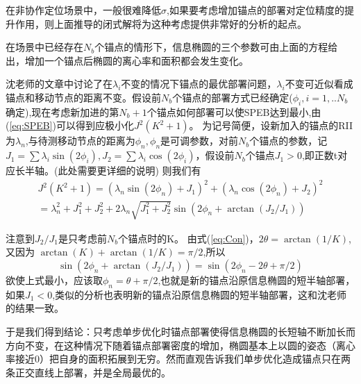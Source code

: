 \documentclass[12pt]{article}
\theoremstyle{remark}
\begin{document}
在非协作定位场景中，一般很难降低$\sigma$,如果要考虑增加锚点的部署对定位精度的提升作用，则上面推导的闭式解将为这种考虑提供非常好的分析的起点。

在场景中已经存在$N_b$个锚点的情形下，信息椭圆的三个参数可由上面的方程给出，增加一个锚点后椭圆的离心率和面积都会发生变化。

沈老师的文章中讨论了在$\lambda_i$不变的情况下锚点的最优部署问题，$\lambda_i$不变可近似看成锚点和移动节点的距离不变。假设前$N_b$个锚点的部署方式已经确定($\phi_i,i=1,..N_b$确定),现在考虑新加进的第$N_b+1$个锚点如何部署可以使SPEB达到最小,由(\ref{eq:SPEB})可以得到应极小化$J^2(K^2+1)$。
为记号简便，设新加入的锚点的RII为$\lambda_n$,与待测移动节点的距离为$\phi_n,\phi_n$是可调参数，对前$N_b$个锚点的参数，记$J_1=\sum \lambda_i \sin(2\phi_i),
J_2=\sum \lambda_i \cos(2\phi_i)$，假设前$N_b$个锚点$J_1>0$,即正数t对应长半轴。(此处需要更详细的说明)
则我们有
\begin{equation}
\begin{split}
J^2(K^2+1)=(\lambda_n\sin(2\phi_n)+J_1)^2+(\lambda_n\cos(2\phi_n)+J_2)^2\\
=\lambda_n^2+J_1^2+J_2^2 + 2\lambda_n\sqrt{J_1^2+J_2^2}\sin(2\phi_n+\arctan(J_2/J_1))
\end{split}
\end{equation}

注意到$J_2/J_1$是只考虑前$N_b$个锚点时的K。
由式(\ref{eq:Con})，$2\theta=\arctan(1/K)$,又因为
$\arctan(K)+\arctan(1/K)=\pi/2$,所以
\begin{equation}
\sin(2\phi_n+\arctan(J_2/J_1))=\sin(2\phi_n-2\theta+\pi/2)
\end{equation}
欲使上式最小，应该取$\phi_n=\theta+\pi/2$,也就是新的锚点沿原信息椭圆的短半轴部署，如果$J_1<0$,类似的分析也表明新的锚点沿原信息椭圆的短半轴部署，这和沈老师的结果一致。

于是我们得到结论：只考虑单步优化时锚点部署使得信息椭圆的长短轴不断加长而方向不变，在这种情况下随着锚点部署密度的增加，椭圆基本上以圆的姿态（离心率接近0）把自身的面积拓展到无穷。然而直观告诉我们单步优化造成锚点只在两条正交直线上部署，并是全局最优的。
\end{document}
